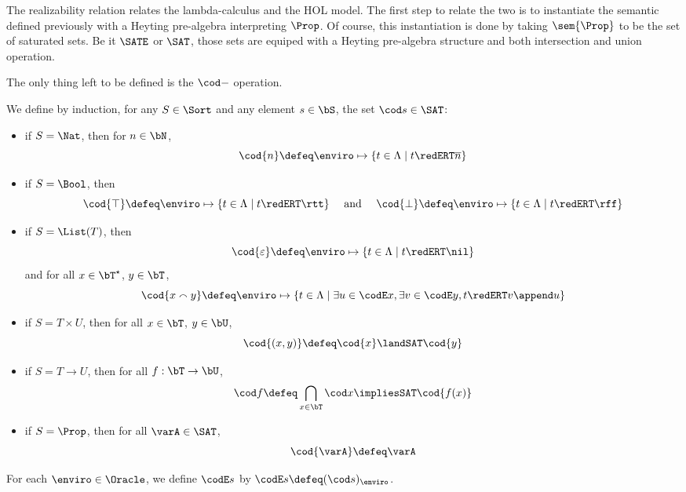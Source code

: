 

The realizability relation relates the lambda-calculus and the HOL model. The first step to relate the two is to instantiate the semantic defined previously with a Heyting pre-algebra interpreting $\Prop$. Of course, this instantiation is done by taking $\sem{\Prop}$ to be the set of saturated sets. Be it $\SATE$ or $\SAT$, those sets are equiped with a Heyting pre-algebra structure and both intersection and union operation.

The only thing left to be defined is the $\cod -$ operation.

\begin{definition}
  We define by induction, for any $S \in \Sort$ and any element $s \in \bS$, the set $\cod s \in \SAT$:
  \begin{itemize}
  \item if $S = \Nat$, then for $n \in \bN$,
    \[\cod{n} \defeq \enviro \mapsto \{ t \in \Lambda \mid t \redERT \overline n\}\]
  \item if $S = \Bool$, then
    \[\cod{\top} \defeq \enviro \mapsto \{ t \in \Lambda \mid t \redERT \rtt\}\quad\text{ and }\quad\cod{\bot} \defeq \enviro\mapsto \{ t \in \Lambda \mid t \redERT \rff\}\]
  \item if $S = \List(T)$, then
    \[\cod{\varepsilon} \defeq \enviro \mapsto\{ t \in \Lambda \mid t \redERT \nil \}\]
    and for all $x \in \bT^\star$, $y \in \bT$,
    \[\cod{x \smallfrown y} \defeq \enviro\mapsto \{ t \in \Lambda \mid \exists u \in \codE x, \exists v \in \codE y, t \redERT v \append u\}\]
  \item if $S = T \times U$, then for all $x \in \bT$, $y \in \bU$,
    \[\cod{(x,y)} \defeq \cod{x} \landSAT \cod{y}\]
  \item if $S = T \to U$, then for all $f : \bT \to \bU$,
    \[\cod f \defeq \bigcap_{x \in \bT} \cod x \impliesSAT \cod{f(x)}\]
  \item if $S = \Prop$, then for all $\varA \in \SAT$,
    \[\cod{\varA} \defeq \varA\]
  \end{itemize}

  For each $\enviro\in\Oracle$, we define $\codE s$ by $\codE s \defeq (\cod s)_\enviro$.
\end{definition}

